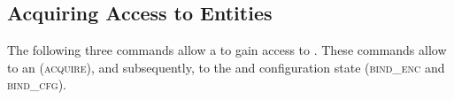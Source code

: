 \documentclass[a4paper, 12pt]{book}
\begin{document}
\subsection{Acquiring Access to Entities}

\newcommand{\dbaiACQUIRE}{{\normalfont\textsc{acquire}}\xspace}
\newcommand{\dbaiBINDENC}{{\normalfont\textsc{bind\_enc}}\xspace}
\newcommand{\dbaiBINDCFG}{{\normalfont\textsc{bind\_cfg}}\xspace}

\newcommand{\dbaiACCRETAIN}{{\normalfont\textsc{retain}}\xspace}
\newcommand{\dbaiACCRENEWC}{{\normalfont\textsc{renew\_constrained}}\xspace}
\newcommand{\dbaiACCRENEWUC}{{\normalfont\textsc{renew\_unconstrained}}\xspace}
\newcommand{\dbaiACCPOSSSIBLY}{{\normalfont\textsc{possibly\_new}}\xspace}

The following three commands allow a  to gain access to 
. These commands allow to  an 
(\dbaiACQUIRE), and subsequently, to  the 
and {configuration state} (\dbaiBINDENC and \dbaiBINDCFG).  
\end{document}
